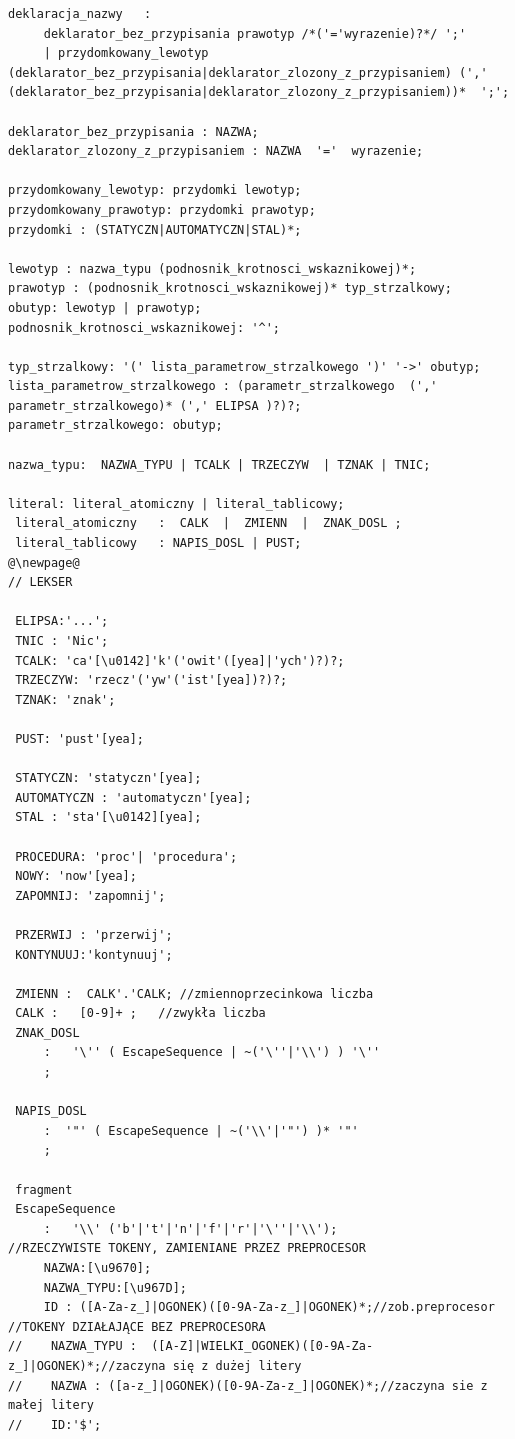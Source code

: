\begin{lstlisting}[basicstyle=\scriptsize\ttfamily,breaklines=true]
deklaracja_nazwy   :
     deklarator_bez_przypisania prawotyp /*('='wyrazenie)?*/ ';'
     | przydomkowany_lewotyp (deklarator_bez_przypisania|deklarator_zlozony_z_przypisaniem) (',' (deklarator_bez_przypisania|deklarator_zlozony_z_przypisaniem))*  ';';

deklarator_bez_przypisania : NAZWA;
deklarator_zlozony_z_przypisaniem : NAZWA  '='  wyrazenie;

przydomkowany_lewotyp: przydomki lewotyp;
przydomkowany_prawotyp: przydomki prawotyp;
przydomki : (STATYCZN|AUTOMATYCZN|STAL)*;

lewotyp : nazwa_typu (podnosnik_krotnosci_wskaznikowej)*;
prawotyp : (podnosnik_krotnosci_wskaznikowej)* typ_strzalkowy;
obutyp: lewotyp | prawotyp;
podnosnik_krotnosci_wskaznikowej: '^';

typ_strzalkowy: '(' lista_parametrow_strzalkowego ')' '->' obutyp;
lista_parametrow_strzalkowego : (parametr_strzalkowego  (',' parametr_strzalkowego)* (',' ELIPSA )?)?;
parametr_strzalkowego: obutyp;

nazwa_typu:  NAZWA_TYPU | TCALK | TRZECZYW  | TZNAK | TNIC;

literal: literal_atomiczny | literal_tablicowy;
 literal_atomiczny   :  CALK  |  ZMIENN  |  ZNAK_DOSL ;
 literal_tablicowy   : NAPIS_DOSL | PUST;
@\newpage@
// LEKSER

 ELIPSA:'...';
 TNIC : 'Nic';
 TCALK: 'ca'[\u0142]'k'('owit'([yea]|'ych')?)?;
 TRZECZYW: 'rzecz'('yw'('ist'[yea])?)?;
 TZNAK: 'znak';

 PUST: 'pust'[yea];

 STATYCZN: 'statyczn'[yea];
 AUTOMATYCZN : 'automatyczn'[yea];
 STAL : 'sta'[\u0142][yea];

 PROCEDURA: 'proc'| 'procedura';
 NOWY: 'now'[yea];
 ZAPOMNIJ: 'zapomnij';

 PRZERWIJ : 'przerwij';
 KONTYNUUJ:'kontynuuj';

 ZMIENN :  CALK'.'CALK; //zmiennoprzecinkowa liczba
 CALK :   [0-9]+ ;   //zwykła liczba
 ZNAK_DOSL
     :   '\'' ( EscapeSequence | ~('\''|'\\') ) '\''
     ;

 NAPIS_DOSL
     :  '"' ( EscapeSequence | ~('\\'|'"') )* '"'
     ;

 fragment
 EscapeSequence
     :   '\\' ('b'|'t'|'n'|'f'|'r'|'\''|'\\');
//RZECZYWISTE TOKENY, ZAMIENIANE PRZEZ PREPROCESOR
     NAZWA:[\u9670];
     NAZWA_TYPU:[\u967D];
     ID : ([A-Za-z_]|OGONEK)([0-9A-Za-z_]|OGONEK)*;//zob.preprocesor
//TOKENY DZIAŁAJĄCE BEZ PREPROCESORA
//    NAZWA_TYPU :  ([A-Z]|WIELKI_OGONEK)([0-9A-Za-z_]|OGONEK)*;//zaczyna się z dużej litery
//    NAZWA : ([a-z_]|OGONEK)([0-9A-Za-z_]|OGONEK)*;//zaczyna sie z małej litery
//    ID:'$';


\end{lstlisting}
